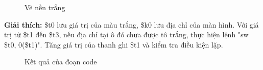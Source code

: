 \documentclass[a4paper,12pt]{article}
\begin{document}
\clearpage
\begin{figure}[ht!]
	\centerline{}
	\caption{Vẽ nền trắng}
	\label{fig:ass1}
\end{figure}
\noindent
\textbf{Giải thích: } \$t0 lưu giá trị của màu trắng, \$k0 lưu địa chỉ của màn hình. Với giá trị từ \$t1 đến \$t3, nếu địa chỉ tại ô đó chưa được tô trắng, thực hiện lệnh "sw \$t0, 0(\$t1)". Tăng giá trị của thanh ghi \$t1 và kiểm tra điều kiện lặp. 
\FloatBarrier
\begin{figure}[ht!]
	\centerline{}
	\caption{Kết quả của đoạn code}
	\label{fig:ass1}
\end{figure}
\end{document}
